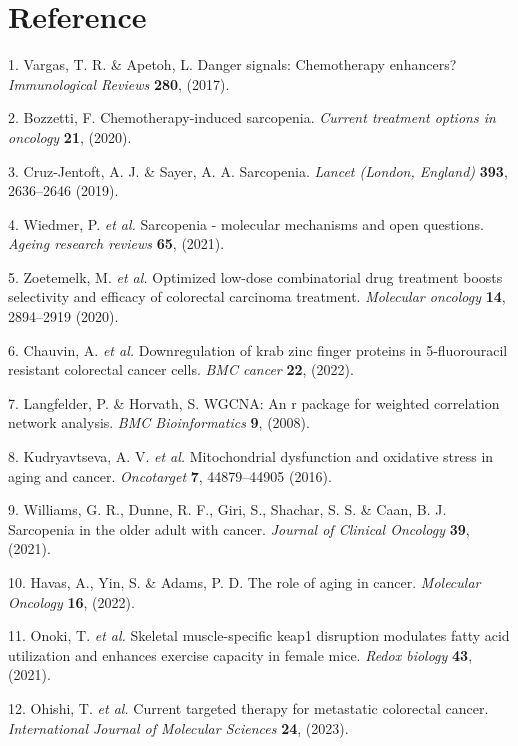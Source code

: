 \documentclass[
]{article}
\newenvironment{cslreferences}%
  {}%
  {\par}
\begin{document}
\hypertarget{bibliography}{%
\section*{Reference}\label{bibliography}}

\hypertarget{refs}{}
\begin{cslreferences}
\leavevmode\hypertarget{ref-DangerSignalsVargas2017}{}%
1. Vargas, T. R. \& Apetoh, L. Danger signals: Chemotherapy enhancers? \emph{Immunological Reviews} \textbf{280}, (2017).

\leavevmode\hypertarget{ref-ChemotherapyInBozzet2020}{}%
2. Bozzetti, F. Chemotherapy-induced sarcopenia. \emph{Current treatment options in oncology} \textbf{21}, (2020).

\leavevmode\hypertarget{ref-SarcopeniaCruzJ2019}{}%
3. Cruz-Jentoft, A. J. \& Sayer, A. A. Sarcopenia. \emph{Lancet (London, England)} \textbf{393}, 2636--2646 (2019).

\leavevmode\hypertarget{ref-SarcopeniaMoWiedme2021}{}%
4. Wiedmer, P. \emph{et al.} Sarcopenia - molecular mechanisms and open questions. \emph{Ageing research reviews} \textbf{65}, (2021).

\leavevmode\hypertarget{ref-OptimizedLowDZoetem2020}{}%
5. Zoetemelk, M. \emph{et al.} Optimized low-dose combinatorial drug treatment boosts selectivity and efficacy of colorectal carcinoma treatment. \emph{Molecular oncology} \textbf{14}, 2894--2919 (2020).

\leavevmode\hypertarget{ref-DownregulationChauvi2022}{}%
6. Chauvin, A. \emph{et al.} Downregulation of krab zinc finger proteins in 5-fluorouracil resistant colorectal cancer cells. \emph{BMC cancer} \textbf{22}, (2022).

\leavevmode\hypertarget{ref-WgcnaAnRPacLangfe2008}{}%
7. Langfelder, P. \& Horvath, S. WGCNA: An r package for weighted correlation network analysis. \emph{BMC Bioinformatics} \textbf{9}, (2008).

\leavevmode\hypertarget{ref-MitochondrialDKudrya2016}{}%
8. Kudryavtseva, A. V. \emph{et al.} Mitochondrial dysfunction and oxidative stress in aging and cancer. \emph{Oncotarget} \textbf{7}, 44879--44905 (2016).

\leavevmode\hypertarget{ref-SarcopeniaInTWillia2021}{}%
9. Williams, G. R., Dunne, R. F., Giri, S., Shachar, S. S. \& Caan, B. J. Sarcopenia in the older adult with cancer. \emph{Journal of Clinical Oncology} \textbf{39}, (2021).

\leavevmode\hypertarget{ref-TheRoleOfAgiHavas2022}{}%
10. Havas, A., Yin, S. \& Adams, P. D. The role of aging in cancer. \emph{Molecular Oncology} \textbf{16}, (2022).

\leavevmode\hypertarget{ref-SkeletalMuscleOnoki2021}{}%
11. Onoki, T. \emph{et al.} Skeletal muscle-specific keap1 disruption modulates fatty acid utilization and enhances exercise capacity in female mice. \emph{Redox biology} \textbf{43}, (2021).

\leavevmode\hypertarget{ref-CurrentTargeteOhishi2023}{}%
12. Ohishi, T. \emph{et al.} Current targeted therapy for metastatic colorectal cancer. \emph{International Journal of Molecular Sciences} \textbf{24}, (2023).
\end{cslreferences}
\end{document}
